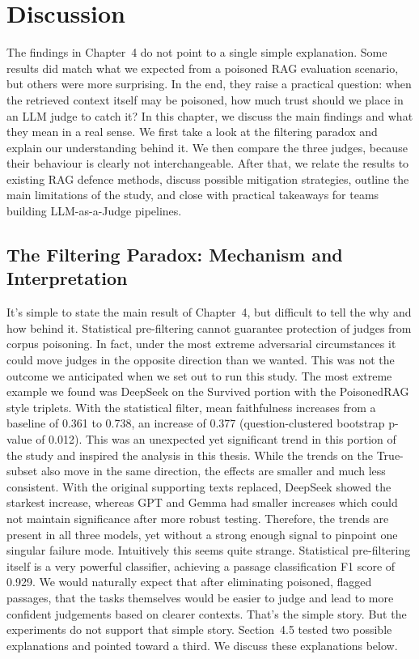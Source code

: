 \chapter{Discussion}

The findings in Chapter~4 do not point to a single simple explanation. Some results did match what we expected from a poisoned RAG evaluation scenario, but others were more surprising. In the end, they raise a practical question: when the retrieved context itself may be poisoned, how much trust should we place in an LLM judge to catch it?
In this chapter, we discuss the main findings and what they mean in a real sense. We first take a look at the filtering paradox and explain our understanding behind it. We then compare the three judges, because their behaviour is clearly not interchangeable. After that, we relate the results to existing RAG defence methods, discuss possible mitigation strategies, outline the main limitations of the study, and close with practical takeaways for teams building LLM-as-a-Judge pipelines.


\section{The Filtering Paradox: Mechanism and Interpretation}

It's simple to state the main result of Chapter~4, but difficult to tell the why and how behind it. Statistical pre-filtering cannot guarantee protection of judges from corpus poisoning. In fact, under the most extreme adversarial circumstances it could move judges in the opposite direction than we wanted. This was not the outcome we anticipated when we set out to run this study.
The most extreme example we found was DeepSeek on the Survived portion with the PoisonedRAG style triplets. With the statistical filter, mean faithfulness increases from a baseline of 0.361 to 0.738, an increase of 0.377 (question-clustered bootstrap p-value of 0.012). This was an unexpected yet significant trend in this portion of the study and inspired the analysis in this thesis.
While the trends on the True-subset also move in the same direction, the effects are smaller and much less consistent. With the original supporting texts replaced, DeepSeek showed the starkest increase, whereas GPT and Gemma had smaller increases which could not maintain significance after more robust testing. Therefore, the trends are present in all three models, yet without a strong enough signal to pinpoint one singular failure mode.
Intuitively this seems quite strange. Statistical pre-filtering itself is a very powerful classifier, achieving a passage classification F1 score of 0.929. We would naturally expect that after eliminating poisoned, flagged passages, that the tasks themselves would be easier to judge and lead to more confident judgements based on clearer contexts. That's the simple story.
But the experiments do not support that simple story. Section~4.5 tested two possible explanations and pointed toward a third. We discuss these explanations below.


